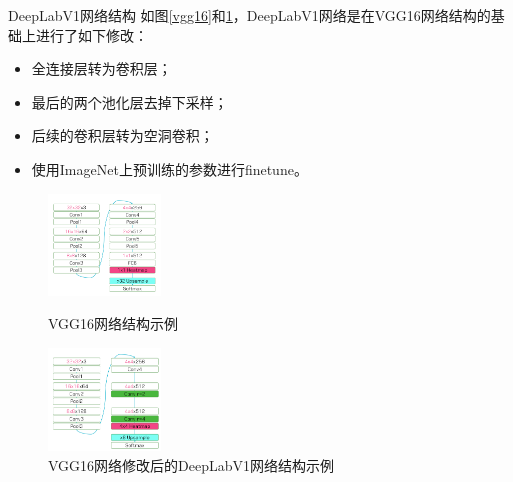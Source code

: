 \documentclass{beamer}
\begin{document}
\begin{frame}{DeepLabV1网络结构}
如图\ref{vgg16}和\ref{vgg16dial}，DeepLabV1网络是在VGG16网络结构的基础上进行了如下修改：
\begin{itemize}
	\item 全连接层转为卷积层；
	\item 最后的两个池化层去掉下采样；
	\item 后续的卷积层转为空洞卷积；
	\item 使用ImageNet上预训练的参数进行finetune。
\end{itemize}

\begin{figure}[h]
	\centering
	\begin{minipage}[t]{0.4\textwidth}
		\centering
		\includegraphics[width=3cm]{images/vgg16.png}
		\caption{\label{vgg16}VGG16网络结构示例}
	\end{minipage}
	\begin{minipage}[t]{0.4\textwidth}
		\centering
		\includegraphics[width=3cm]{images/vgg16dial.png}
		\caption{\label{vgg16dial}VGG16网络修改后的DeepLabV1网络结构示例}
	\end{minipage}
\end{figure}

\end{frame}
\end{document}

